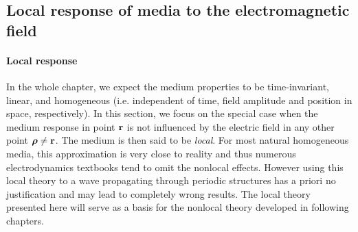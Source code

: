 \subsection{Local response of media to the electromagnetic field} \label{loc_response_of_media}
\paragraph{Local response}  %
In the whole chapter, we expect the medium properties to be time-invariant, linear, and homogeneous (i.e. independent of time, field amplitude and position in space, respectively). 
In this section, we focus on the special case when the medium response in point ${\mathbf{r}}$ is not influenced by the electric field in any other point $\boldsymbol{\rho} \neq {\mathbf{r}}$. The medium is then said to be \textit{local}. 
For most natural homogeneous media, this approximation is very close to reality and thus numerous electrodynamics textbooks tend to omit the nonlocal effects. 
However using this local theory to a wave propagating through periodic structures has a priori no justification and may lead to completely wrong results. The local theory presented here will serve as a basis for the nonlocal theory developed in following chapters.

